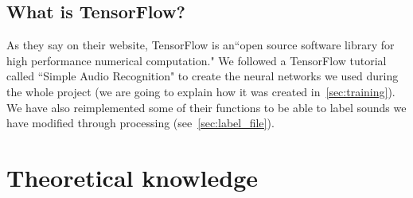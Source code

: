 \documentclass[11pt,a4paper,titlepage]{report}
\begin{document}
\section{What is TensorFlow?}
\hspace*{0.6cm}
As they say on their website, TensorFlow is an``open source software library for high performance numerical computation."\cite{TensorFlow} We followed a TensorFlow tutorial called ``Simple Audio Recognition" to create the neural networks we used during the whole project (we are going to explain how it was created in~\ref{sec:training}). We have also reimplemented some of their functions to be able to label sounds we have modified through processing (see~\ref{sec:label_file}).
\chapter{Theoretical knowledge}
\end{document}
